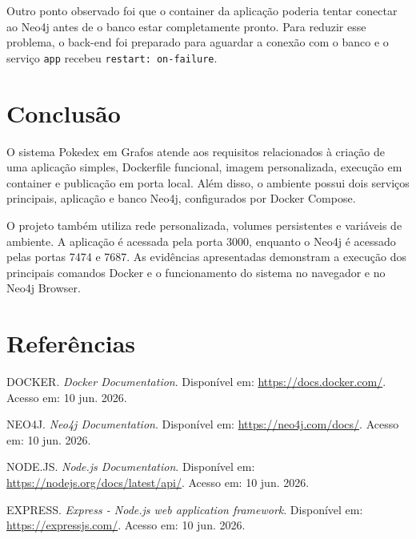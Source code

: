 \documentclass[12pt,a4paper]{article}
\begin{document}
Outro ponto observado foi que o container da aplicação poderia tentar conectar ao Neo4j antes de o banco estar completamente pronto. Para reduzir esse problema, o back-end foi preparado para aguardar a conexão com o banco e o serviço \texttt{app} recebeu \texttt{restart: on-failure}.

\section{Conclusão}

O sistema Pokedex em Grafos atende aos requisitos relacionados à criação de uma aplicação simples, Dockerfile funcional, imagem personalizada, execução em container e publicação em porta local. Além disso, o ambiente possui dois serviços principais, aplicação e banco Neo4j, configurados por Docker Compose.

O projeto também utiliza rede personalizada, volumes persistentes e variáveis de ambiente. A aplicação é acessada pela porta 3000, enquanto o Neo4j é acessado pelas portas 7474 e 7687. As evidências apresentadas demonstram a execução dos principais comandos Docker e o funcionamento do sistema no navegador e no Neo4j Browser.

\section{Referências}

DOCKER. \textit{Docker Documentation}. Disponível em: \url{https://docs.docker.com/}. Acesso em: 10 jun. 2026.

NEO4J. \textit{Neo4j Documentation}. Disponível em: \url{https://neo4j.com/docs/}. Acesso em: 10 jun. 2026.

NODE.JS. \textit{Node.js Documentation}. Disponível em: \url{https://nodejs.org/docs/latest/api/}. Acesso em: 10 jun. 2026.

EXPRESS. \textit{Express - Node.js web application framework}. Disponível em: \url{https://expressjs.com/}. Acesso em: 10 jun. 2026.
\end{document}
